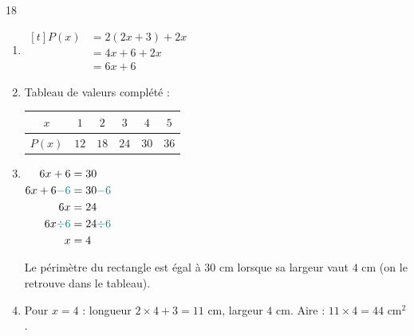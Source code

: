 \documentclass[10pt,a4paper]{article}
\begin{document}
\begin{corr}[Un rectangle]{18}
\begin{enumerate}[leftmargin=*]
    \item \(\begin{aligned}[t] P(x)&=2(2x+3)+2x\\ &=4x+6+2x\\ &=6x+6\end{aligned}\)
    \item Tableau de valeurs complété :
    \begin{center}
    \renewcommand{\arraystretch}{1.5}
    \begin{tabular}{|*{6}{c|}}
        \hline
        \(x\) & \(1\) & \(2\) & \(3\) & \(4\) & \(5\) \\ \hline
        \(P(x)\) & \(12\) & \(18\) & \(24\) & \(30\) & \(36\) \\ \hline
    \end{tabular}
    \end{center}
    \item
    \(\begin{aligned}[t]
    6x+6 &= 30\\
    6x+6\textcolor{teal}{-6} &= 30\textcolor{teal}{-6}\\
    6x &= 24\\
    6x\textcolor{teal}{\div 6} &= 24\textcolor{teal}{\div 6}\\
    x &= 4
    \end{aligned}\)

    Le périmètre du rectangle est égal à \(30\) cm lorsque sa largeur vaut \(4\) cm (on le retrouve dans le tableau).
    \item Pour \(x=4\) : longueur \(2\times 4+3=11\) cm, largeur \(4\) cm. Aire : \(11\times 4=44\) cm\(^2\).
\end{enumerate}
\end{corr}
\end{document}
